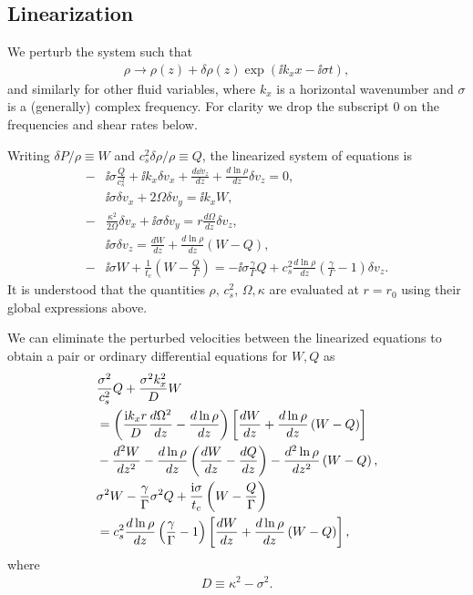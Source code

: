 \subsection{Linearization}
 We perturb the system such that
 \begin{align}
   \rho \to \rho(z) + \delta\rho(z)\exp{\left(\ii k_x x - \ii\sigma
       t\right)},    
 \end{align}
 and similarly for other fluid variables, where $k_x$ is a horizontal
 wavenumber and $\sigma$ is a (generally) complex frequency. For
 clarity we drop the subscript $0$ on the frequencies and shear rates
 below. 
 
 Writing $\delta P /\rho \equiv W$ and $c_s^2\delta\rho/\rho\equiv Q$, 
 the linearized system of equations is 
 \begin{align}
   -&\ii\sigma \frac{Q}{c_s^2} + \ii k_x \delta v_x + \frac{d\dd
     v_z}{dz} + \frac{d\ln{\rho}}{dz}\delta v_z = 0,\\
   &\ii\sigma \delta v_x + 2\Omega\delta v_y = \ii k_x W,\\
   -&\frac{\kappa^2}{2\Omega}\delta v_x + \ii \sigma\delta v_y =
   r\frac{d\Omega}{dz}\delta v_z, \\
   & \ii\sigma\delta v_z = \frac{dW}{dz} +
   \frac{d\ln{\rho}}{dz}\left(W-Q\right), \\
   -&\ii\sigma W + \frac{1}{t_c}\left(W-\frac{Q}{\Gamma}\right) = -\ii\sigma\frac{\gamma}{\Gamma} Q +
   c_s^2\frac{d\ln{\rho}}{dz}\left(\frac{\gamma}{\Gamma}-1\right)\delta v_z.
 \end{align}
It is understood that the quantities $\rho,\,c_s^2,\,\Omega,\kappa$
are evaluated at $r=r_0$ using their global expressions above.  

We can eliminate the perturbed velocities between the linearized
equations to obtain a pair or ordinary differential equations
for $W,Q$ as
\begin{align}
  &\frac{\sigma^2}{c_s^2}Q + \frac{\sigma^2k_x^2}{D}W \notag\\ 
  &=\left(\frac{\mathrm{i}
    k_x r}{D}\frac{d\Omega^2}{dz} -
  \frac{d\ln{\rho}}{dz}\right)\left[\frac{dW}{dz} +
  \frac{d\ln{\rho}}{dz}\left(W-Q\right)\right] \notag\\
&- \frac{d^2W}{dz^2} - \frac{d\ln{\rho}}{dz}\left(\frac{dW}{dz} -
  \frac{dQ}{dz}\right) - \frac{d^2\ln{\rho}}{dz^2}\left(W-Q\right),\label{ode_w}\\
&\sigma^2W - \frac{\gamma}{\Gamma}\sigma^2 Q +
\frac{\mathrm{i}\sigma}{t_c}\left(W-\frac{Q}{\Gamma}\right)\notag\\
&=c_s^2\frac{d\ln{\rho}}{dz}\left(\frac{\gamma}{\Gamma} - 1\right) 
\left[\frac{dW}{dz} + \frac{d\ln{\rho}}{dz}\left(W-Q\right)\right],\label{ode_Q} 
\end{align}
where
\begin{align}
  D \equiv \kappa^2 - \sigma^2.
\end{align}